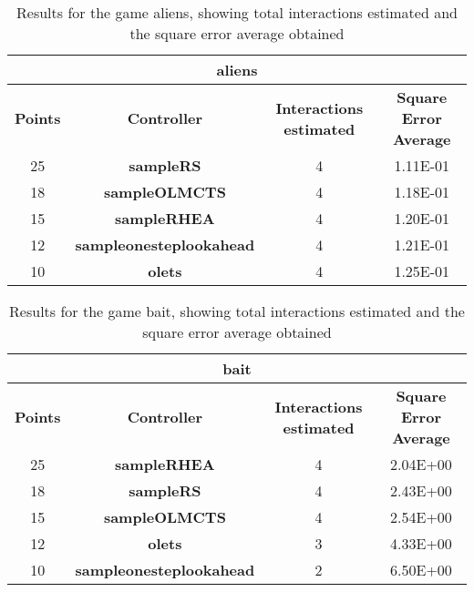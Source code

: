 \begin{table*}[!t]
\begin{center}
\begin{adjustbox}{width=1\textwidth}
\begin{tabular}{|c|c|c|c|}
\hline
\multicolumn{4}{|c|}{\textbf{aliens}}\\
\hline
\textbf{Points} & \textbf{Controller} & \textbf{Interactions estimated} & \textbf{Square Error Average}\\
\hline
25 & \textbf{sampleRS} & 4 & 1.11E-01
 \\
\hline
18 & \textbf{sampleOLMCTS} & 4 & 1.18E-01
 \\
\hline
15 & \textbf{sampleRHEA} & 4 & 1.20E-01
 \\
\hline
12 & \textbf{sampleonesteplookahead} & 4 & 1.21E-01
 \\
\hline
10 & \textbf{olets} & 4 & 1.25E-01
 \\
\hline
\end{tabular}
\end{adjustbox}
\caption{Results for the game aliens, showing total interactions estimated and the square error average obtained}
\label{tab:weights}
\end{center}
\end{table*}
\begin{table*}[!t]
\begin{center}
\begin{adjustbox}{width=1\textwidth}
\begin{tabular}{|c|c|c|c|}
\hline
\multicolumn{4}{|c|}{\textbf{bait}}\\
\hline
\textbf{Points} & \textbf{Controller} & \textbf{Interactions estimated} & \textbf{Square Error Average}\\
\hline
25 & \textbf{sampleRHEA} & 4 & 2.04E+00
 \\
\hline
18 & \textbf{sampleRS} & 4 & 2.43E+00
 \\
\hline
15 & \textbf{sampleOLMCTS} & 4 & 2.54E+00
 \\
\hline
12 & \textbf{olets} & 3 & 4.33E+00
 \\
\hline
10 & \textbf{sampleonesteplookahead} & 2 & 6.50E+00
 \\
\hline
\end{tabular}
\end{adjustbox}
\caption{Results for the game bait, showing total interactions estimated and the square error average obtained}
\label{tab:weights}
\end{center}
\end{table*}
